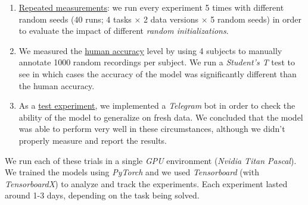 \documentclass{elsarticle}
\begin{document}
\begin{enumerate}
\begin{itemize}
	\end{itemize}
	\item \underline{Repeated measurements}: we run every experiment 5 times with different random seeds (40 runs; 4 tasks $\times$ 2 data versions $\times$ 5 random seeds) in order to evaluate the impact of different \textit{random initializations}.
	\item We measured the \underline{human accuracy} level by using 4 subjects to manually annotate 1000 random recordings per subject. We run a \textit{Student's T} test to see in which cases the accuracy of the model was significantly different than the human accuracy.
	\item As a \underline{test experiment}, we implemented a \textit{Telegram} bot in order to check the ability of the model to generalize on fresh data. We concluded that the model was able to perform very well in these circumstances, although we didn't properly measure and report the results.
\end{enumerate}

We run each of these trials in a single \textit{GPU} environment (\textit{Nvidia Titan Pascal}). We trained the models using \textit{PyTorch} and we used \textit{Tensorboard} (with \textit{TensorboardX}) to analyze and track the experiments. Each experiment lasted around 1-3 days, depending on the task being solved.



\end{document}
